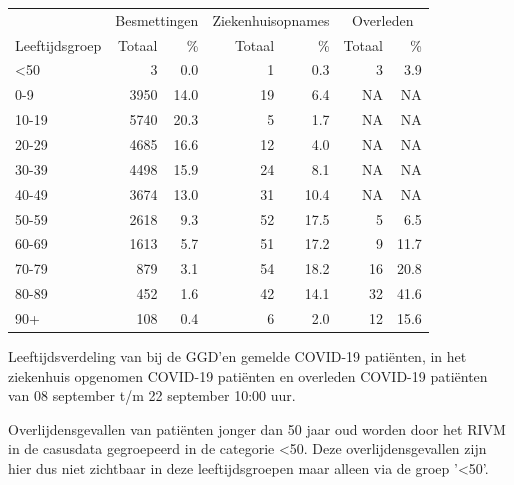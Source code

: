 \documentclass[
  english,
  man,floatsintext]{apa6}
\begin{document}
\begin{table}
\centering\begingroup\fontsize{11}{13}\selectfont

\begin{threeparttable}
\begin{tabular}{lrrrrrr}
\toprule
\multicolumn{1}{c}{ } & \multicolumn{2}{c}{Besmettingen} & \multicolumn{2}{c}{Ziekenhuisopnames} & \multicolumn{2}{c}{Overleden} \\
\cmidrule(l{3pt}r{3pt}){2-3} \cmidrule(l{3pt}r{3pt}){4-5} \cmidrule(l{3pt}r{3pt}){6-7}
Leeftijdsgroep & Totaal & \% & Totaal & \% & Totaal & \%\\
\midrule
<50 & 3 & 0.0 & 1 & 0.3 & 3 & 3.9\\
0-9 & 3950 & 14.0 & 19 & 6.4 & NA & NA\\
10-19 & 5740 & 20.3 & 5 & 1.7 & NA & NA\\
20-29 & 4685 & 16.6 & 12 & 4.0 & NA & NA\\
30-39 & 4498 & 15.9 & 24 & 8.1 & NA & NA\\
40-49 & 3674 & 13.0 & 31 & 10.4 & NA & NA\\
50-59 & 2618 & 9.3 & 52 & 17.5 & 5 & 6.5\\
60-69 & 1613 & 5.7 & 51 & 17.2 & 9 & 11.7\\
70-79 & 879 & 3.1 & 54 & 18.2 & 16 & 20.8\\
80-89 & 452 & 1.6 & 42 & 14.1 & 32 & 41.6\\
90+ & 108 & 0.4 & 6 & 2.0 & 12 & 15.6\\
\bottomrule
\end{tabular}
\begin{tablenotes}
\item[1] Leeftijdsverdeling van bij de GGD’en gemelde COVID-19 patiënten, in het ziekenhuis opgenomen COVID-19 patiënten en overleden COVID-19 patiënten van 08 september t/m 22 september 10:00 uur.
\item[2] Overlijdensgevallen van patiënten jonger dan 50 jaar oud worden door het RIVM in de casusdata gegroepeerd in de categorie <50. Deze overlijdensgevallen zijn hier dus niet zichtbaar in deze leeftijdsgroepen maar alleen via de groep '<50'.
\end{tablenotes}
\end{threeparttable}
\endgroup{}
\end{table}

\newpage
\end{document}
